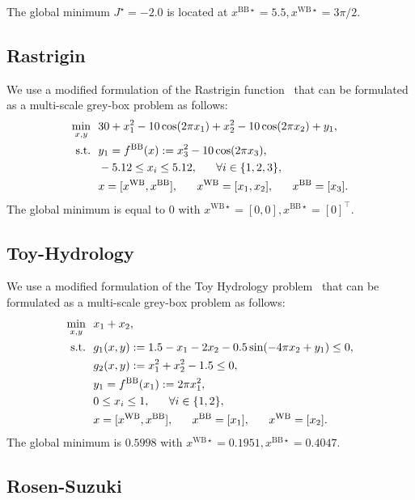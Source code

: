 \documentclass[12pt,a4paper]{article}%
\theoremstyle{plain}%
\theoremstyle{remark}%
\theoremstyle{definition}%
\def\WB{\mathrm{WB}}
\def\BB{\mathrm{BB}}
\providecommand{\DIFaddtex}[1]{{\protect\color{blue}\uwave{#1}}} %
\providecommand{\DIFdeltex}[1]{{\protect\color{red}\sout{#1}}}                      %
\providecommand{\DIFaddbegin}{} %
\providecommand{\DIFaddend}{} %
\providecommand{\DIFdelbegin}{} %
\providecommand{\DIFdelend}{} %
\providecommand{\DIFadd}[1]{\texorpdfstring{\DIFaddtex{#1}}{#1}} %
\providecommand{\DIFdel}[1]{\texorpdfstring{\DIFdeltex{#1}}{}} %
\newcommand{\DIFscaledelfig}{0.5}
\newlength{\DIFdelgraphicswidth} %
\newlength{\DIFdelgraphicsheight} %
\newcommand{\DIFaddincludegraphics}[2][]{{\color{blue}\fbox{\DIFOincludegraphics[#1]{#2}}}} %
\newcommand{\DIFdelincludegraphics}[2][]{%
\sbox{\DIFdelgraphicsbox}{\DIFOincludegraphics[#1]{#2}}%
\settoboxwidth{\DIFdelgraphicswidth}{\DIFdelgraphicsbox} %
\settoboxtotalheight{\DIFdelgraphicsheight}{\DIFdelgraphicsbox} %
\scalebox{\DIFscaledelfig}{%
\parbox[b]{\DIFdelgraphicswidth}{\usebox{\DIFdelgraphicsbox}\\[-\baselineskip] \rule{\DIFdelgraphicswidth}{0em}}\llap{\resizebox{\DIFdelgraphicswidth}{\DIFdelgraphicsheight}{%
\setlength{\unitlength}{\DIFdelgraphicswidth}%
\begin{picture}(1,1)%
\thicklines\linethickness{2pt} %
{\color[rgb]{1,0,0}\put(0,0){\framebox(1,1){}}}%
{\color[rgb]{1,0,0}\put(0,0){\line( 1,1){1}}}%
{\color[rgb]{1,0,0}\put(0,1){\line(1,-1){1}}}%
\end{picture}%
}\hspace*{3pt}}} %
} %
\DeclareRobustCommand{\DIFaddbegin}{\DIFOaddbegin \let\includegraphics\DIFaddincludegraphics} %
\DeclareRobustCommand{\DIFaddend}{\DIFOaddend \let\includegraphics\DIFOincludegraphics} %
\DeclareRobustCommand{\DIFdelbegin}{\DIFOdelbegin \let\includegraphics\DIFdelincludegraphics} %
\DeclareRobustCommand{\DIFdelend}{\DIFOaddend \let\includegraphics\DIFOincludegraphics} %
\begin{document}
\begin{appendices}
The global minimum $J^\star = -2.0$ is located at $x^{\BB\star}=5.5, x^{\WB\star}=3\pi/2$.

\subsection{Rastrigin}\label{subsec:app_rastrigin}

We use a modified formulation of the Rastrigin function~\cite{rastrigin1974} that can be formulated as a multi-scale grey-box problem as follows:
\begin{align} \label{eq:Rastrigin}
    \min_{x, y} &~~ 30 + x_1^2 - 10\cos(2\pi x_1) + x_2^2 - 10\cos(2\pi x_2) + y_1, \\\notag
    \text{s.t.} &~~ y_1 = f^\BB(x) := x_3^2 - 10\cos( 2 \pi x_3), \\\notag
    &~~ -5.12 \leq x_i \leq 5.12, ~~~~~ \forall i \in \{ 1, 2,3 \}, \\\notag
    &~~ x = [x^{\WB}, x^{\BB}], ~~~~~ x^{\WB} = [x_1, x_2], ~~~~~ x^{\BB} = [x_3].
\end{align}
The global minimum is equal to $0$ with $x^{\WB\star} = [0, 0], x^{\BB\star} = [0]^\top$.

\subsection{Toy-Hydrology}\label{subsec:app_hydrology}

We use a modified formulation of the Toy Hydrology problem~\cite{gramacy2016} that can be formulated as a multi-scale grey-box problem as follows:
\begin{align} \label{eq:ToyHydrology}
    \min_{x, y} &~~ x_1 + x_2, \\\notag
    \text{s.t.} &~~ g_1(x, y) := 1.5 - x_1 - 2x_2 - 0.5\sin(-4\pi x_2 + y_1) \leq 0, \\\notag
    &~~ g_2(x, y) := x_1^2 + x_2^2 - 1.5 \leq 0, \\\notag
    &~~ y_1 = f^\BB(x_1) := 2 \pi x_1^2, \\\notag
    &~~ 0 \leq x_i \leq 1, ~~~~~ \forall i \in \{ 1, 2 \}, \\\notag
    &~~ x = [x^{\WB}, x^{\BB}], ~~~~~ x^{\BB} = [x_1], ~~~~~ x^{\WB} = [x_2].
\end{align}
The global minimum is $0.5998$ with \DIFdelbegin \DIFdel{$x^{\WB\star} = 0.1951, x^{\BB\star} = 0.4047$}\DIFdelend \DIFaddbegin \DIFadd{$x^{\WB\star} = 0.4047, x^{\BB\star} = 0.1951$}\DIFaddend .

\subsection{Rosen-Suzuki}\label{subsec:app_rosen_suzuki}


\end{appendices}
\end{document}
